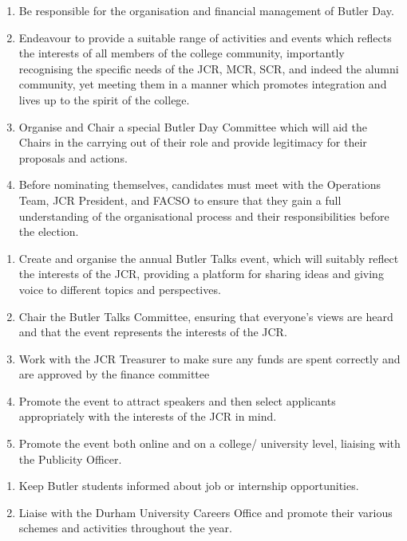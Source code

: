 \begin{enumerate}
    \item Be responsible for the organisation and financial management of Butler Day.
    \item Endeavour to provide a suitable range of activities and events which reflects the interests of all members of the college community, importantly recognising the specific needs of the JCR, MCR, SCR, and indeed the alumni community, yet meeting them in a manner which promotes integration and lives up to the spirit of the college.
    \item Organise and Chair a special Butler Day Committee which will aid the Chairs in the carrying out of their role and provide legitimacy for their proposals and actions.
    \item Before nominating themselves, candidates must meet with the Operations Team, JCR President, and FACSO to ensure that they gain a full understanding of the organisational process and their responsibilities before the election.
    
\end{enumerate}

\begin{enumerate}
    \item Create and organise the annual Butler Talks event, which will suitably reflect the interests of the JCR, providing a platform for sharing ideas and giving voice to different topics and perspectives.
    \item Chair the Butler Talks Committee, ensuring that everyone’s views are heard and that the event represents the interests of the JCR.
    \item Work with the JCR Treasurer to make sure any funds are spent correctly and are approved by the finance committee   \item Promote the event to attract speakers and then select applicants appropriately with the interests of the JCR in mind.
    \item Promote the event both online and on a college/ university level, liaising with the Publicity Officer.
    
\end{enumerate}

\begin{enumerate}
    \item Keep Butler students informed about job or internship opportunities.
    \item Liaise with the Durham University Careers Office and promote their various schemes and activities throughout the year.
    
\end{enumerate}

